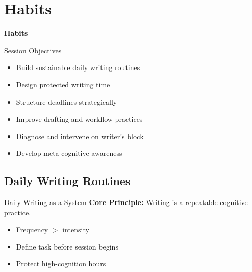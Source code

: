 \documentclass{beamer}
\begin{document}

\section{Habits}

\begin{frame}
  \centering
  \vfill
  {\Large\bfseries Habits}
  \vfill
\end{frame}



\begin{frame}{Session Objectives}
\begin{itemize}
    \item Build sustainable daily writing routines
    \item Design protected writing time
    \item Structure deadlines strategically
    \item Improve drafting and workflow practices
    \item Diagnose and intervene on writer’s block
    \item Develop meta-cognitive awareness
\end{itemize}
\end{frame}

\subsection{Daily Writing Routines}

\begin{frame}{Daily Writing as a System}
\textbf{Core Principle:} Writing is a repeatable cognitive practice.

\begin{itemize}
    \item Frequency $>$ intensity
    \item Define task before session begins
    \item Protect high-cognition hours
\end{itemize}
\end{frame}

\end{document}
